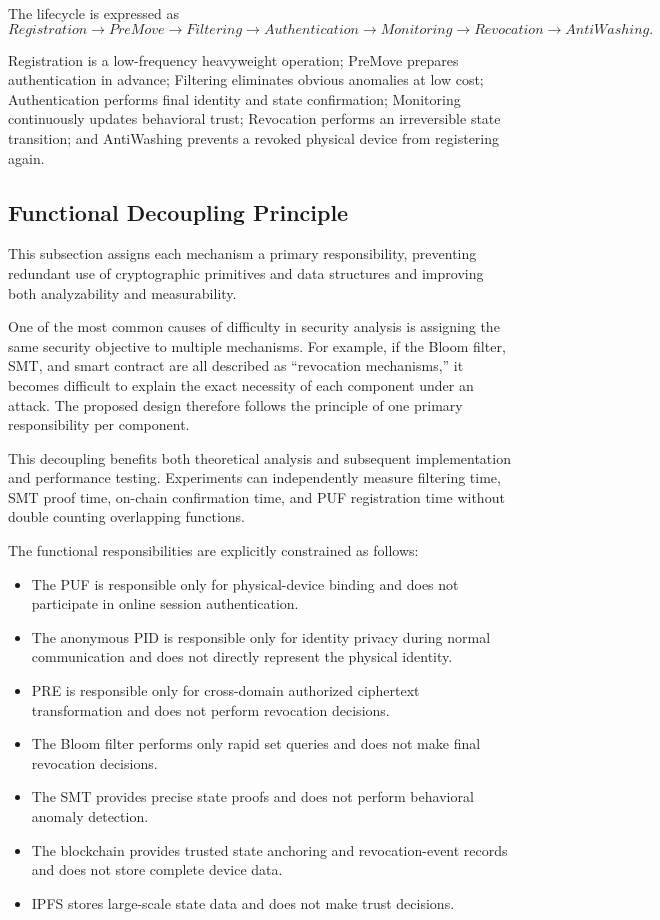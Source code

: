 \documentclass[lettersize,journal]{IEEEtran}
\begin{document}
	The lifecycle is expressed as
	\begin{equation}
		Registration\rightarrow PreMove\rightarrow Filtering\rightarrow Authentication\rightarrow Monitoring\rightarrow Revocation\rightarrow AntiWashing.
	\end{equation}
	
	Registration is a low-frequency heavyweight operation; PreMove prepares authentication in advance; Filtering eliminates obvious anomalies at low cost; Authentication performs final identity and state confirmation; Monitoring continuously updates behavioral trust; Revocation performs an irreversible state transition; and AntiWashing prevents a revoked physical device from registering again.
	
	\subsection{Functional Decoupling Principle}
	This subsection assigns each mechanism a primary responsibility, preventing redundant use of cryptographic primitives and data structures and improving both analyzability and measurability.
	
	
	One of the most common causes of difficulty in security analysis is assigning the same security objective to multiple mechanisms. For example, if the Bloom filter, SMT, and smart contract are all described as ``revocation mechanisms,'' it becomes difficult to explain the exact necessity of each component under an attack. The proposed design therefore follows the principle of one primary responsibility per component.
	
	This decoupling benefits both theoretical analysis and subsequent implementation and performance testing. Experiments can independently measure filtering time, SMT proof time, on-chain confirmation time, and PUF registration time without double counting overlapping functions.
	
	The functional responsibilities are explicitly constrained as follows:
	\begin{itemize}
		\item The PUF is responsible only for physical-device binding and does not participate in online session authentication.
		\item The anonymous PID is responsible only for identity privacy during normal communication and does not directly represent the physical identity.
		\item PRE is responsible only for cross-domain authorized ciphertext transformation and does not perform revocation decisions.
		\item The Bloom filter performs only rapid set queries and does not make final revocation decisions.
		\item The SMT provides precise state proofs and does not perform behavioral anomaly detection.
		\item The blockchain provides trusted state anchoring and revocation-event records and does not store complete device data.
		\item IPFS stores large-scale state data and does not make trust decisions.
	\end{itemize}
	
\end{document}
